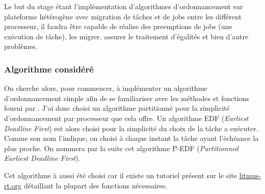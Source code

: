 Le but du stage étant l'implémentation d'algorithmes d'ordonnancement sur plateforme hétérogène avec migration de tâches et de jobs entre les différent \gls{processeur}, il faudra être capable de réalise des \glspl{preemption} de jobs (une exécution de tâche), les migrer, assurer le traitement d'égalités et bien d'autre problèmes.


\subsubsection{Algorithme considéré}

On cherche alors, pour commencer, à implémenter un algorithme d'ordonnancement simple afin de se familiariser avec les méthodes et fonctions fourni par \litmus. J'ai donc choisi un algorithme partitionné pour la simplicité d'ordonnancement par \gls{processeur} que cela offre. Un algorithme EDF (\textit{Earliest Deadline First}) est alors choisi pour la simplicité du choix de la tâche a exécuter. Comme son nom l'indique, on choisi à chaque instant la tâche ayant l'échéance la plus proche. On nommera par la suite cet algorithme P-EDF (\textit{Partitionned Earliest Deadline First}).

Cet algorithme à aussi été choisi car il existe un tutoriel présent sur le site \href{https://litmus-rt.org}{litmus-rt.org} détaillant la plupart des fonctions nécessaires. 


